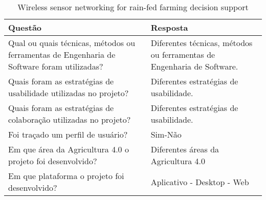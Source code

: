 \documentclass[12pt]{article}
\begin{document}
\begin{table}[!htb]
	\footnotesize
  \centering
	\begin{tabular}{|p{8cm}|p{6cm}|}
		\hline
		\textbf{Questão}                                                                           & \textbf{Resposta}                                                      \\ \hline
		Qual ou quais técnicas, métodos ou ferramentas de Engenharia de Software foram utilizadas? & Diferentes técnicas, métodos ou ferramentas de Engenharia de Software. \\ \hline
		Quais foram as estratégias de usabilidade utilizadas no projeto?                           & Diferentes estratégias de usabilidade.                                 \\ \hline
		Quais foram as estratégias de colaboração utilizadas no projeto?                           & Diferentes estratégias de usabilidade.                                 \\ \hline
		Foi traçado um perfil de usuário?                                                          & Sim-Não                                                                \\ \hline
		Em que área da Agricultura 4.0 o projeto foi desenvolvido?                                 & Diferentes áreas da Agricultura 4.0                                    \\ \hline
		Em que plataforma o projeto foi desenvolvido?                                              & Aplicativo - Desktop - Web                                 \\ \hline
		\end{tabular}
  \caption{Wireless sensor networking for rain-fed farming decision support}
  \label{tab:extracao4}
\end{table}
\end{document}
